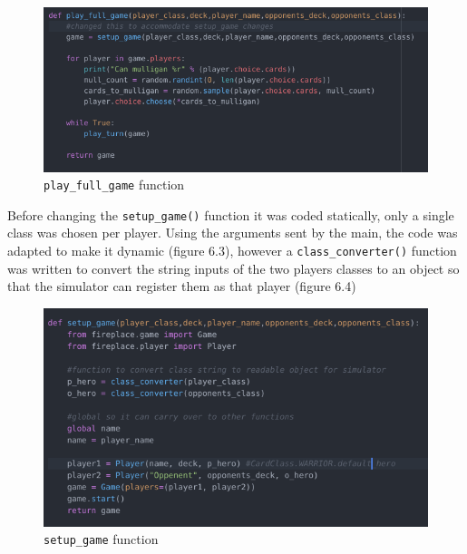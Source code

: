 \documentclass{report} %
\begin{document}
\begin{figure}[H]
\centering
\includegraphics[width=1.25\textwidth]{playFullGame}
\caption{\nolinkurl{play_full_game} function \protect}
\label{board}
\end{figure}

Before changing the \nolinkurl{setup_game()} function it was coded statically, only a single class was chosen per player. Using the arguments sent by the main, the code was adapted to make it dynamic (figure 6.3), however a \nolinkurl{class_converter()} function was written to convert the string inputs of the two players classes to an object so that the simulator can register them as that player (figure 6.4)

\begin{figure}[H]
\centering
\includegraphics[width=1\textwidth]{setupGame}
\caption{\nolinkurl{setup_game} function \protect}
\label{board}
\end{figure}
\end{document}
